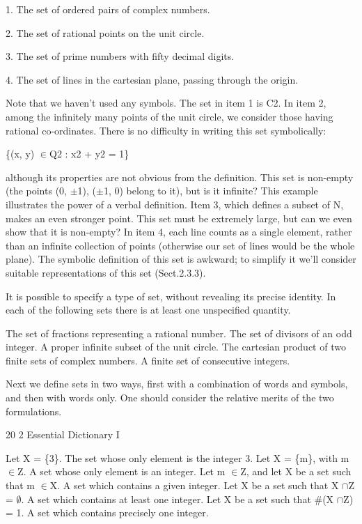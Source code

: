 \documentclass[11pt]{article}
\theoremstyle{plain}
\theoremstyle{definition}
\begin{document}
1. The set of ordered pairs of complex numbers.

2. The set of rational points on the unit circle.

3. The set of prime numbers with fifty decimal digits.

4. The set of lines in the cartesian plane, passing through the origin.

Note that we haven't used any symbols. The set in item 1 is C2. In item 2, among the infinitely many points of the unit circle, we consider those having rational co-ordinates. There is no difficulty in writing this set symbolically:

\{(x, y) $\in$Q2 : x2 + y2 = 1\}

although its properties are not obvious from the definition. This set is non-empty (the points (0, $\pm$1), ($\pm$1, 0) belong to it), but is it infinite? This example illustrates the power of a verbal definition. Item 3, which defines a subset of N, makes an even stronger point. This set must be extremely large, but can we even show that it is non-empty? In item 4, each line counts as a single element, rather than an infinite collection of points (otherwise our set of lines would be the whole plane). The symbolic definition of this set is awkward; to simplify it we'll consider suitable representations of this set (Sect.2.3.3).

It is possible to specify a type of set, without revealing its precise identity. In each of the following sets there is at least one unspecified quantity.

The set of fractions representing a rational number. The set of divisors of an odd integer. A proper infinite subset of the unit circle. The cartesian product of two finite sets of complex numbers. A finite set of consecutive integers.

Next we define sets in two ways, first with a combination of words and symbols, and then with words only. One should consider the relative merits of the two formulations.

20 2 Essential Dictionary I

Let X = \{3\}. The set whose only element is the integer 3. Let X = \{m\}, with m $\in$Z. A set whose only element is an integer. Let m $\in$Z, and let X be a set such that m $\in$X. A set which contains a given integer. Let X be a set such that X $\cap$Z = $\emptyset$. A set which contains at least one integer. Let X be a set such that \#(X $\cap$Z) = 1. A set which contains precisely one integer.
\end{document}
